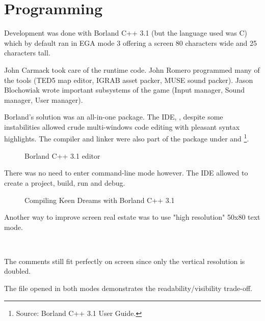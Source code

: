 \documentclass[book.tex]{subfiles}
\begin{document}
\section{Programming}



Development was done with Borland C++ 3.1 (but the language used was C) which by default ran in EGA mode 3 offering a screen 80 characters wide and 25 characters tall.\\
\par
John Carmack took care of the runtime code. John Romero programmed many of the tools (TED5 map editor, IGRAB asset packer, MUSE sound packer). Jason Blochowiak wrote important subsystems of the game (Input manager, Sound manager, User manager).\\
\par
Borland's solution was an all-in-one package. The IDE, , despite some instabilities allowed crude multi-windows code editing with pleasant syntax highlights. The compiler and linker were also part of the package under  and \footnote{Source: Borland C++ 3.1 User Guide.}.\\

\begin{figure}[H]
\centering
\caption{Borland C++ 3.1 editor}
\end{figure}
\par

\pagebreak


There was no need to enter command-line mode however. The IDE allowed to create a project, build, run and debug.\\
\par
\begin{figure}[H]
\centering
  \caption{Compiling Keen Dreams with Borland C++ 3.1}
\end{figure}






Another way to improve screen real estate was to use "high resolution" 50x80 text mode.\\
\par 
 \\
 \par
 \vspace{-7pt}
The comments still fit perfectly on screen since only the vertical resolution is doubled.\\
\par
\vspace{-4pt}
 The file  opened in both modes demonstrates the readability/visibility trade-off.\\
\par
\end{document}
